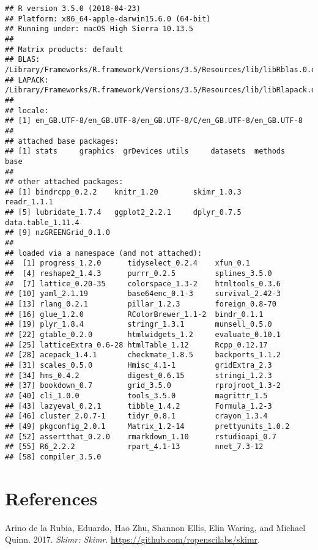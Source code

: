 \documentclass[]{article}
\begin{document}
\begin{verbatim}
## R version 3.5.0 (2018-04-23)
## Platform: x86_64-apple-darwin15.6.0 (64-bit)
## Running under: macOS High Sierra 10.13.5
## 
## Matrix products: default
## BLAS: /Library/Frameworks/R.framework/Versions/3.5/Resources/lib/libRblas.0.dylib
## LAPACK: /Library/Frameworks/R.framework/Versions/3.5/Resources/lib/libRlapack.dylib
## 
## locale:
## [1] en_GB.UTF-8/en_GB.UTF-8/en_GB.UTF-8/C/en_GB.UTF-8/en_GB.UTF-8
## 
## attached base packages:
## [1] stats     graphics  grDevices utils     datasets  methods   base     
## 
## other attached packages:
## [1] bindrcpp_0.2.2    knitr_1.20        skimr_1.0.3       readr_1.1.1      
## [5] lubridate_1.7.4   ggplot2_2.2.1     dplyr_0.7.5       data.table_1.11.4
## [9] nzGREENGrid_0.1.0
## 
## loaded via a namespace (and not attached):
##  [1] progress_1.2.0      tidyselect_0.2.4    xfun_0.1           
##  [4] reshape2_1.4.3      purrr_0.2.5         splines_3.5.0      
##  [7] lattice_0.20-35     colorspace_1.3-2    htmltools_0.3.6    
## [10] yaml_2.1.19         base64enc_0.1-3     survival_2.42-3    
## [13] rlang_0.2.1         pillar_1.2.3        foreign_0.8-70     
## [16] glue_1.2.0          RColorBrewer_1.1-2  bindr_0.1.1        
## [19] plyr_1.8.4          stringr_1.3.1       munsell_0.5.0      
## [22] gtable_0.2.0        htmlwidgets_1.2     evaluate_0.10.1    
## [25] latticeExtra_0.6-28 htmlTable_1.12      Rcpp_0.12.17       
## [28] acepack_1.4.1       checkmate_1.8.5     backports_1.1.2    
## [31] scales_0.5.0        Hmisc_4.1-1         gridExtra_2.3      
## [34] hms_0.4.2           digest_0.6.15       stringi_1.2.3      
## [37] bookdown_0.7        grid_3.5.0          rprojroot_1.3-2    
## [40] cli_1.0.0           tools_3.5.0         magrittr_1.5       
## [43] lazyeval_0.2.1      tibble_1.4.2        Formula_1.2-3      
## [46] cluster_2.0.7-1     tidyr_0.8.1         crayon_1.3.4       
## [49] pkgconfig_2.0.1     Matrix_1.2-14       prettyunits_1.0.2  
## [52] assertthat_0.2.0    rmarkdown_1.10      rstudioapi_0.7     
## [55] R6_2.2.2            rpart_4.1-13        nnet_7.3-12        
## [58] compiler_3.5.0
\end{verbatim}

\section*{References}\label{references}

\hypertarget{refs}{}
\hypertarget{ref-skimr}{}
Arino de la Rubia, Eduardo, Hao Zhu, Shannon Ellis, Elin Waring, and
Michael Quinn. 2017. \emph{Skimr: Skimr}.
\url{https://github.com/ropenscilabs/skimr}.
\end{document}
